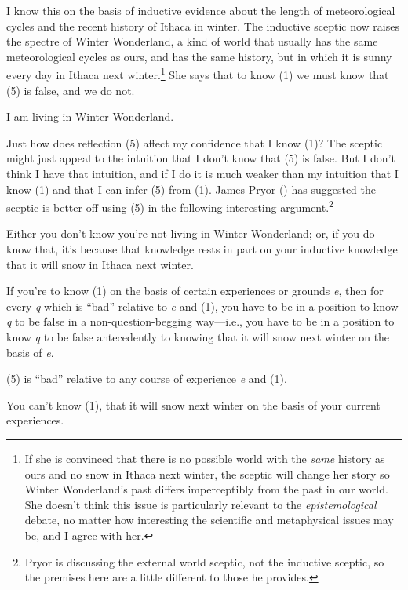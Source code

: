 \documentclass[
  11pt,
  letterpaper,
  DIV=11,
  numbers=noendperiod,
  twoside]{scrartcl}
\providecommand{\tightlist}{%
  \setlength{\itemsep}{0pt}\setlength{\parskip}{0pt}}
\begin{document}
I know this on the basis of inductive evidence about the length of
meteorological cycles and the recent history of Ithaca in winter. The
inductive sceptic now raises the spectre of Winter Wonderland, a kind of
world that usually has the same meteorological cycles as ours, and has
the same history, but in which it is sunny every day in Ithaca next
winter.\footnote{If she is convinced that there is no possible world
  with the \emph{same} history as ours and no snow in Ithaca next
  winter, the sceptic will change her story so Winter Wonderland's past
  differs imperceptibly from the past in our world. She doesn't think
  this issue is particularly relevant to the \emph{epistemological}
  debate, no matter how interesting the scientific and metaphysical
  issues may be, and I agree with her.} She says that to know (1) we
must know that (5) is false, and we do not.

\begin{description}
\tightlist
\item[(5)]
I am living in Winter Wonderland.
\end{description}

Just how does reflection (5) affect my confidence that I know (1)? The
sceptic might just appeal to the intuition that I don't know that (5) is
false. But I don't think I have that intuition, and if I do it is much
weaker than my intuition that I know (1) and that I can infer (5) from
(1). James Pryor () has suggested
the sceptic is better off using (5) in the following interesting
argument.\footnote{Pryor is discussing the external world sceptic, not
  the inductive sceptic, so the premises here are a little different to
  those he provides.}

\begin{description}
\tightlist
\item[(6)]
Either you don't know you're not living in Winter Wonderland; or, if you
do know that, it's because that knowledge rests in part on your
inductive knowledge that it will snow in Ithaca next winter.
\item[(7)]
If you're to know (1) on the basis of certain experiences or grounds
\emph{e}, then for every \emph{q} which is ``bad'' relative to \emph{e}
and (1), you have to be in a position to know \emph{q} to be false in a
non-question-begging way---i.e., you have to be in a position to know
\emph{q} to be false antecedently to knowing that it will snow next
winter on the basis of \emph{e}.
\item[(8)]
(5) is ``bad'' relative to any course of experience \emph{e} and (1).
\item[C]
You can't know (1), that it will snow next winter on the basis of your
current experiences.
\end{description}
\end{document}
